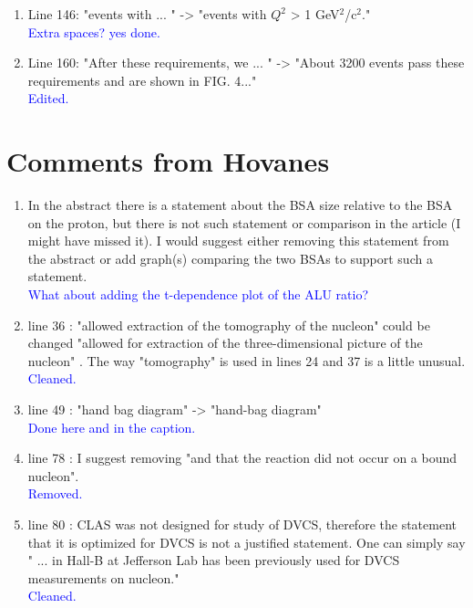 \documentclass[a4paper,11pt,twoside]{article}
\begin{document}
\begin{enumerate}
\item Line 146: "events with ... " -> "events with $Q^2$ > 1 GeV$^2$/c$^2$."\\
\textcolor{blue}{Extra spaces? yes done. }
  
\item Line 160: "After these requirements, we ... " -> "About 3200 events pass
these requirements and are shown in FIG. 4..."\\
\textcolor{blue}{Edited.}
  
\end{enumerate}


\section{Comments from Hovanes}

\begin{enumerate}
\item In the abstract there is a statement about the BSA size relative to
the BSA on the proton, but there
is not such statement or comparison in the article (I might have missed
it). I would suggest either removing
this statement from the abstract or add graph(s) comparing the two BSAs
to support such a statement.\\
\textcolor{blue}{What about adding the t-dependence plot of the ALU ratio? }
  
\item line 36 : "allowed extraction of the tomography of the nucleon" could
be changed "allowed for extraction
of the three-dimensional picture of the nucleon" . The way "tomography"
is used in lines 24 and 37 is a little
unusual.\\
\textcolor{blue}{Cleaned. }
  
\item line 49 : "hand bag diagram" -> "hand-bag diagram"\\
\textcolor{blue}{Done here and in the caption.}
  
\item line 78 : I suggest removing "and that the reaction did not occur on
a bound nucleon".\\
\textcolor{blue}{Removed. }
  
\item line 80 : CLAS was not designed for study of DVCS, therefore the
statement that it is optimized for DVCS
is not a justified statement. One can simply say " ... in Hall-B at
Jefferson Lab has been previously used for DVCS
measurements on nucleon."\\
\textcolor{blue}{Cleaned.}
  

\end{enumerate}
\end{document}
